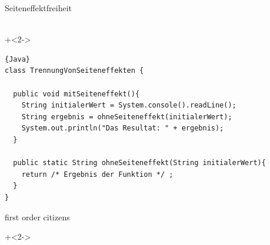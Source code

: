 \begin{frame}[fragile]{}

\begin{center}
\LARGE
Seiteneffektfreiheit
\end{center}


~\\

\onslide+<2->
\begin{lstlisting}{Java}
class TrennungVonSeiteneffekten {

  public void mitSeiteneffekt(){
    String initialerWert = System.console().readLine(); 
    String ergebnis = ohneSeiteneffekt(initialerWert);
    System.out.println("Das Resultat: " + ergebnis);
  }

  public static String ohneSeiteneffekt(String initialerWert){
    return /* Ergebnis der Funktion */ ;
  }
}
\end{lstlisting}

\end{frame}

\begin{frame}[fragile]{}

\begin{center}
\LARGE
{} \glqq{}first order citizens\grqq{}
\end{center}

\onslide+<2->
\begin{center}
\end{center}

\end{frame}

